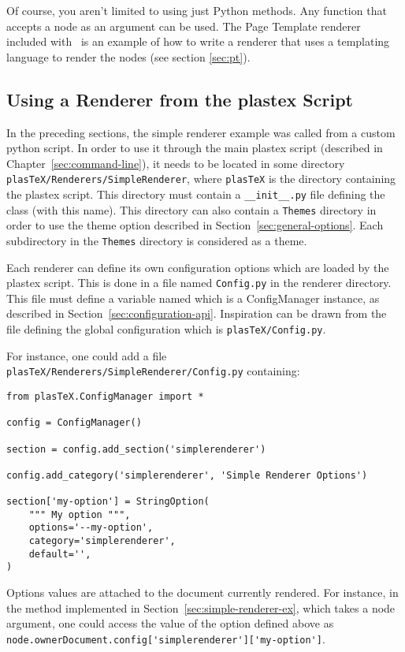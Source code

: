 Of course, you aren't limited to using just Python methods.  Any function
that accepts a node as an argument can be used.  The
Page Template renderer included with \plasTeX\ is an example
of how to write a renderer that uses a templating language to render
the nodes (see section \ref{sec:pt}).

\subsection{Using a Renderer from the plastex Script}
\label{subsec:renderer-from-script}

In the preceding sections, the simple renderer example was called from
a custom python script. In order to use it through the
main plastex script (described in Chapter~\ref{sec:command-line}), it
needs to be located in some directory
\verb+plasTeX/Renderers/SimpleRenderer+, where \verb+plasTeX+ is the
directory containing the plastex script. This directory must contain a
\verb+__init__.py+ file defining the  class (with this
name). This directory can also contain a \verb+Themes+ directory in
order to use the theme option described in
Section~\ref{sec:general-options}. Each subdirectory in the
\verb+Themes+ directory is considered as a theme.

Each renderer can define its own configuration options which are loaded
by the plastex script. This is done in a file named \verb+Config.py+
in the renderer directory. This file must define a variable named
 which is a ConfigManager instance, as described in
Section~\ref{sec:configuration-api}. Inspiration can be drawn from the
file defining the global configuration which is
\verb+plasTeX/Config.py+.

For instance, one could add a file
\verb+plasTeX/Renderers/SimpleRenderer/Config.py+ containing:

\begin{verbatim}
from plasTeX.ConfigManager import *

config = ConfigManager()

section = config.add_section('simplerenderer')

config.add_category('simplerenderer', 'Simple Renderer Options')

section['my-option'] = StringOption(
    """ My option """,
    options='--my-option',
    category='simplerenderer',
    default='',
)
\end{verbatim}

Options values are attached to the document currently rendered. For
instance, in the  method implemented in
Section~\ref{sec:simple-renderer-ex}, which takes a node argument, one
could access the value of the option defined above as
\verb+node.ownerDocument.config['simplerenderer']['my-option']+.


